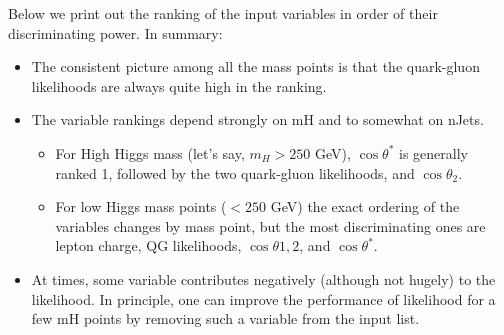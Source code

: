 Below we print out the ranking of
the input variables in order of their discriminating power.
In summary:
\begin{itemize}
\item  The consistent picture among all the mass points is that the 
quark-gluon likelihoods are always quite high in the ranking.
\item  The variable rankings depend strongly on mH and to somewhat
   on nJets.
   \begin{itemize}
   \item  For High Higgs mass (let's say, $m_H > 250$ GeV), $\cos\theta^*$
        is generally ranked 1, followed by  the two quark-gluon
        likelihoods, and $\cos\theta_2$.
    \item  For low Higgs mass points ($< 250$ GeV) the exact ordering of the
        variables changes by mass point, but the most discriminating
        ones are lepton charge, QG likelihoods, $\cos\theta{1,2}$, 
        and $\cos\theta^*$.
     \end{itemize}

\item  At times, some variable contributes negatively (although not hugely)
to the likelihood. In principle, one can improve the performance of
likelihood for a few mH points by removing such a variable from the
input list.
\end{itemize}


